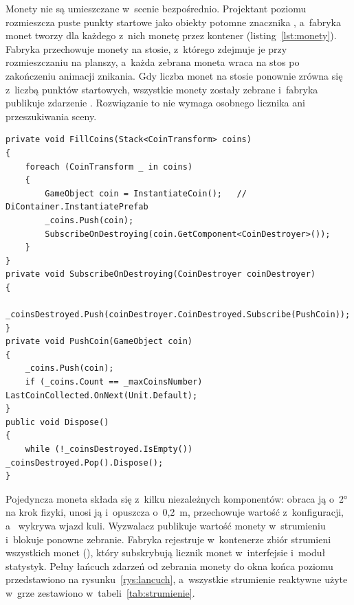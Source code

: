 Monety nie są umieszczane w~scenie bezpośrednio. Projektant poziomu rozmieszcza puste
punkty startowe jako obiekty potomne znacznika , a~fabryka monet
tworzy dla każdego z~nich monetę przez kontener (listing~\ref{lst:monety}). Fabryka
przechowuje monety na stosie, z~którego zdejmuje je przy rozmieszczaniu na planszy,
a~każda zebrana moneta wraca na stos po zakończeniu animacji znikania. Gdy liczba monet
na stosie ponownie zrówna się z~liczbą punktów startowych, wszystkie monety zostały
zebrane i~fabryka publikuje zdarzenie . Rozwiązanie to nie wymaga
osobnego licznika ani przeszukiwania sceny.

\begin{lstlisting}[caption={Fragment fabryki monet; \zrodloWlasne},label=lst:monety]
private void FillCoins(Stack<CoinTransform> coins)
{
    foreach (CoinTransform _ in coins)
    {
        GameObject coin = InstantiateCoin();   // DiContainer.InstantiatePrefab
        _coins.Push(coin);
        SubscribeOnDestroying(coin.GetComponent<CoinDestroyer>());
    }
}
private void SubscribeOnDestroying(CoinDestroyer coinDestroyer)
{
    _coinsDestroyed.Push(coinDestroyer.CoinDestroyed.Subscribe(PushCoin));
}
private void PushCoin(GameObject coin)
{
    _coins.Push(coin);
    if (_coins.Count == _maxCoinsNumber) LastCoinCollected.OnNext(Unit.Default);
}
public void Dispose()
{
    while (!_coinsDestroyed.IsEmpty()) _coinsDestroyed.Pop().Dispose();
}
\end{lstlisting}

Pojedyncza moneta składa się z~kilku niezależnych komponentów: 
obraca ją o~2° na krok fizyki,  unosi ją i~opuszcza o~0,2~m,
 przechowuje wartość z~konfiguracji, a~ wykrywa
wjazd kuli. Wyzwalacz publikuje wartość monety w~strumieniu  i~blokuje
ponowne zebranie. Fabryka rejestruje w~kontenerze zbiór strumieni wszystkich monet
(), który subskrybują licznik monet w~interfejsie i~moduł
statystyk. Pełny łańcuch zdarzeń od zebrania monety do okna końca poziomu przedstawiono
na rysunku~\ref{rys:lancuch}, a~wszystkie strumienie reaktywne użyte w~grze zestawiono
w~tabeli~\ref{tab:strumienie}.

